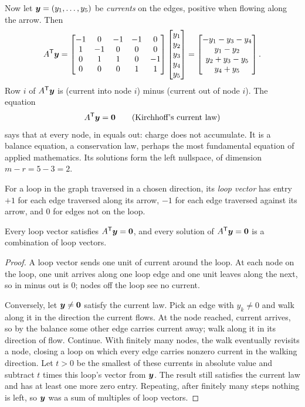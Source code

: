 Now let $\boldsymbol{y}=(y_1,\dots,y_5)$ be \emph{currents} on the edges, positive when flowing along the
arrow. Then
\[
A^{\mathsf{T}}\boldsymbol{y}=\begin{bmatrix}-1&0&-1&-1&0\\1&-1&0&0&0\\0&1&1&0&-1\\0&0&0&1&1\end{bmatrix}
\begin{bmatrix}y_1\\y_2\\y_3\\y_4\\y_5\end{bmatrix}
=\begin{bmatrix}-y_1-y_3-y_4\\y_1-y_2\\y_2+y_3-y_5\\y_4+y_5\end{bmatrix}.
\]
Row $i$ of $A^{\mathsf{T}}\boldsymbol{y}$ is (current into node $i$) minus (current out of node $i$). The equation
\[
A^{\mathsf{T}}\boldsymbol{y}=\boldsymbol{0}\qquad\text{(Kirchhoff's current law)}
\]
says that at every node, in equals out: charge does not accumulate. It is a balance equation, a
conservation law, perhaps the most fundamental equation of applied mathematics. Its solutions form
the left nullspace, of dimension $m-r=5-3=2$.

\begin{definition}\label{def:u13-loop}
For a loop in the graph traversed in a chosen direction, its \emph{loop vector} has entry $+1$ for
each edge traversed along its arrow, $-1$ for each edge traversed against its arrow, and $0$ for
edges not on the loop.
\end{definition}

\begin{theorem}\label{thm:u13-loops}
Every loop vector satisfies $A^{\mathsf{T}}\boldsymbol{y}=\boldsymbol{0}$, and every solution of $A^{\mathsf{T}}\boldsymbol{y}=\boldsymbol{0}$ is a
combination of loop vectors.
\end{theorem}
\begin{proof}
A loop vector sends one unit of current around the loop. At each node on the loop, one unit
arrives along one loop edge and one unit leaves along the next, so in minus out is $0$; nodes off
the loop see no current.

Conversely, let $\boldsymbol{y}\ne\boldsymbol{0}$ satisfy the current law. Pick an edge with $y_k\ne0$ and walk along
it in the direction the current flows. At the node reached, current arrives, so by the balance
some other edge carries current away; walk along it in its direction of flow. Continue. With
finitely many nodes, the walk eventually revisits a node, closing a loop on which every edge carries
nonzero current in the walking direction. Let $t>0$ be the smallest of these currents in absolute
value and subtract $t$ times this loop's vector from $\boldsymbol{y}$. The result still satisfies the
current law and has at least one more zero entry. Repeating, after finitely many steps nothing is
left, so $\boldsymbol{y}$ was a sum of multiples of loop vectors.
\end{proof}

